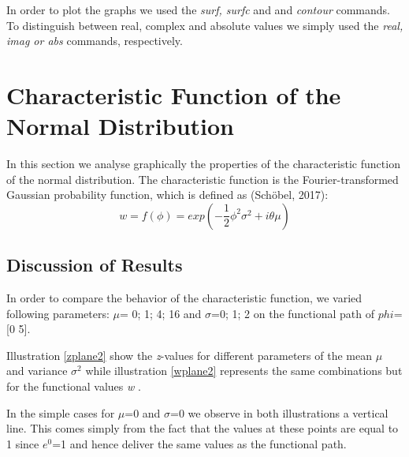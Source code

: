 \documentclass[a4paper,11pt]{article}
\begin{document}
In order to plot the graphs we used the \textit{surf, surfc} and and \textit{contour} commands. To distinguish between real, complex and absolute values we simply used the \textit{real, imag or abs} commands, respectively.
\section{Characteristic Function of the Normal Distribution}
In this section we analyse graphically the properties of the characteristic function of the normal distribution.  The characteristic function is the Fourier-transformed Gaussian probability function, which is defined as (Sch\"obel, 2017):
\begin{equation}
w=f(\phi)=exp(-\dfrac{1}{2}\phi^2\sigma^2+i\theta\mu)
\end{equation}
\subsection{Discussion of Results}
In order to compare the behavior of the characteristic function, we varied following parameters:
$\mu$= 0; 1; 4; 16 and $\sigma$=0; 1; 2 on the functional path of $phi$=[0 5].

Illustration \ref{zplane2} show the \textit{z}-values for different parameters of the mean $\mu$ and variance $\sigma^2$ while illustration \ref{wplane2} represents the same combinations but for the functional values \textit{w} .

In the simple cases for $\mu$=0 and $\sigma$=0 we observe in both illustrations a vertical line. This comes simply from the fact that the values at these points are equal to 1 since $e^0$=1 and hence deliver the same values as the functional path.
\end{document}
